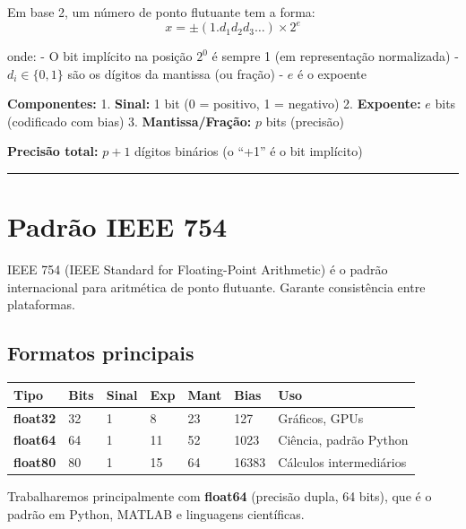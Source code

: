 \documentclass[
  11pt,
  letterpaper,
  DIV=11,
  numbers=noendperiod]{scrartcl}
\newcounter{none} %
\begin{document}
Em base 2, um número de ponto flutuante tem a forma:
\[x = \pm (1.d_1 d_2 d_3 \ldots) \times 2^e\]

onde: - O bit implícito na posição \(2^0\) é sempre 1 (em representação
normalizada) - \(d_i \in \{0, 1\}\) são os dígitos da mantissa (ou
fração) - \(e\) é o expoente

\textbf{Componentes:} 1. \textbf{Sinal:} 1 bit (0 = positivo, 1 =
negativo) 2. \textbf{Expoente:} \(e\) bits (codificado com bias) 3.
\textbf{Mantissa/Fração:} \(p\) bits (precisão)

\textbf{Precisão total:} \(p + 1\) dígitos binários (o ``+1'' é o bit
implícito)

\begin{center}\rule{0.5\linewidth}{0.5pt}\end{center}

\section{Padrão IEEE 754}\label{padruxe3o-ieee-754}

IEEE 754 (IEEE Standard for Floating-Point Arithmetic) é o padrão
internacional para aritmética de ponto flutuante. Garante consistência
entre plataformas.

\subsection{Formatos principais}\label{formatos-principais}

{\def\LTcaptype{none} %
\begin{longtable}[]{@{}lllllll@{}}
\toprule\noalign{}
Tipo & Bits & Sinal & Exp & Mant & Bias & Uso \\
\midrule\noalign{}
\endhead
\bottomrule\noalign{}
\endlastfoot
\textbf{float32} & 32 & 1 & 8 & 23 & 127 & Gráficos, GPUs \\
\textbf{float64} & 64 & 1 & 11 & 52 & 1023 & Ciência, padrão Python \\
\textbf{float80} & 80 & 1 & 15 & 64 & 16383 & Cálculos intermediários \\
\end{longtable}
}

\begin{tcolorbox}[enhanced jigsaw, arc=.35mm, bottomrule=.15mm, bottomtitle=1mm, breakable, colback=white, colbacktitle=quarto-callout-note-color!10!white, colframe=quarto-callout-note-color-frame, coltitle=black, left=2mm, leftrule=.75mm, opacityback=0, opacitybacktitle=0.6, rightrule=.15mm, title=\textcolor{quarto-callout-note-color}{\faInfo}\hspace{0.5em}{Foco neste curso}, titlerule=0mm, toprule=.15mm, toptitle=1mm]

Trabalharemos principalmente com \textbf{float64} (precisão dupla, 64
bits), que é o padrão em Python, MATLAB e linguagens científicas.

\end{tcolorbox}
\end{document}
